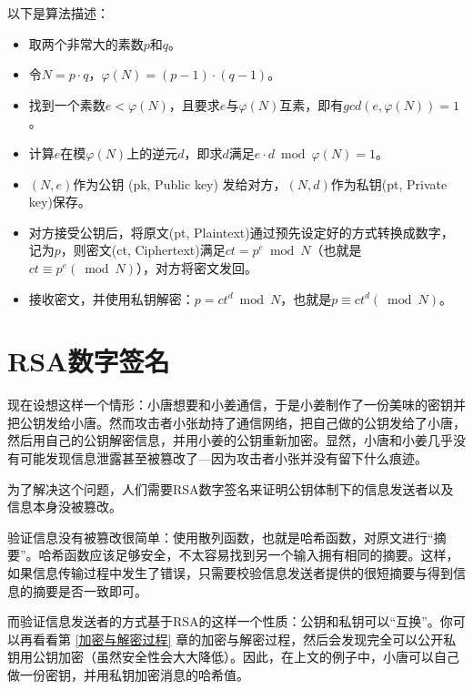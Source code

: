 \documentclass[a4paper]{article}  %
\begin{document}
以下是算法描述：
\begin{itemize}
	\item 取两个非常大的素数$p$和$q$。
	\item 令$N = p \cdot q$，$\varphi(N) = (p - 1) \cdot (q - 1)$。
	\item 找到一个素数$e < \varphi(N)$，且要求$e$与$\varphi(N)$互素，即有$gcd(e, \varphi(N)) = 1$。 %
	\item 计算$e$在模$\varphi(N)$上的逆元$d$，即求$d$满足$e \cdot d \bmod \varphi(N) = 1$。
	\item $(N, e)$作为公钥 (pk, Public key) 发给对方，$(N, d)$作为私钥(pt, Private key)保存。
	\item 对方接受公钥后，将原文(pt, Plaintext)通过预先设定好的方式转换成数字，记为$p$，则密文(ct, Ciphertext)满足$ct = p ^ e \bmod N$（也就是$ct \equiv p ^ e (\bmod N)$），对方将密文发回。
	\item 接收密文，并使用私钥解密：$p = ct ^ d \bmod N$，也就是$p \equiv ct ^ d (\bmod N)$。
\end{itemize}

\section{RSA数字签名}

现在设想这样一个情形：小唐想要和小姜通信，于是小姜制作了一份美味的密钥并把公钥发给小唐。然而攻击者小张劫持了通信网络，把自己做的公钥发给了小唐，然后用自己的公钥解密信息，并用小姜的公钥重新加密。显然，小唐和小姜几乎没有可能发现信息泄露甚至被篡改了---因为攻击者小张并没有留下什么痕迹。

为了解决这个问题，人们需要RSA数字签名来证明公钥体制下的信息发送者以及信息本身没被篡改。

验证信息没有被篡改很简单：使用散列函数，也就是哈希函数，对原文进行“摘要”。哈希函数应该足够安全，不太容易找到另一个输入拥有相同的摘要。这样，如果信息传输过程中发生了错误，只需要校验信息发送者提供的很短摘要与得到信息的摘要是否一致即可。

而验证信息发送者的方式基于RSA的这样一个性质：公钥和私钥可以“互换”。你可以再看看第 \ref{加密与解密过程} 章的加密与解密过程，然后会发现完全可以公开私钥用公钥加密（虽然安全性会大大降低）。因此，在上文的例子中，小唐可以自己做一份密钥，并用私钥加密消息的哈希值。

\end{document}
